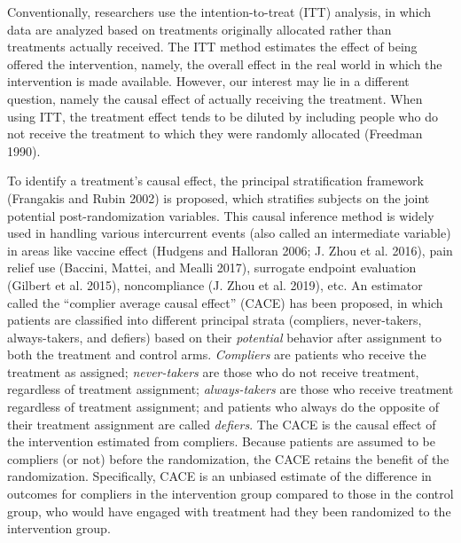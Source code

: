 Conventionally, researchers use the intention-to-treat (ITT) analysis, in which data are analyzed based on treatments originally allocated rather than treatments actually received. The ITT method estimates the effect of being offered the intervention, namely, the overall effect in the real world in which the intervention is made available. However, our interest may lie in a different question, namely the causal effect of actually receiving the treatment. When using ITT, the treatment effect tends to be diluted by including people who do not receive the treatment to which they were randomly allocated (Freedman 1990).

To identify a treatment's causal effect, the principal stratification framework (Frangakis and Rubin 2002) is proposed, which stratifies subjects on the joint potential post-randomization variables. This causal inference method is widely used in handling various intercurrent events (also called an intermediate variable) in areas like vaccine effect (Hudgens and Halloran 2006; J. Zhou et al. 2016), pain relief use (Baccini, Mattei, and Mealli 2017), surrogate endpoint evaluation (Gilbert et al. 2015), noncompliance (J. Zhou et al. 2019), etc. An estimator called the ``complier average causal effect'' (CACE) has been proposed, in which patients are classified into different principal strata (compliers, never-takers, always-takers, and defiers) based on their \emph{potential} behavior after assignment to both the treatment and control arms. \emph{Compliers} are patients who receive the treatment as assigned; \emph{never-takers} are those who do not receive treatment, regardless of treatment assignment; \emph{always-takers} are those who receive treatment regardless of treatment assignment; and patients who always do the opposite of their treatment assignment are called \emph{defiers}. The CACE is the causal effect of the intervention estimated from compliers. Because patients are assumed to be compliers (or not) before the randomization, the CACE retains the benefit of the randomization. Specifically, CACE is an unbiased estimate of the difference in outcomes for compliers in the intervention group compared to those in the control group, who would have engaged with treatment had they been randomized to the intervention group.

